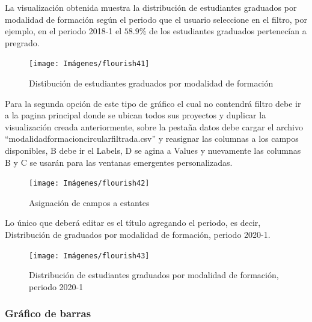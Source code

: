 \documentclass[
]{book}
\begin{document}
La visualización obtenida muestra la distribución de estudiantes graduados por modalidad de formación según el periodo que el usuario seleccione en el filtro, por ejemplo, en el periodo 2018-1 el \(58.9\%\) de los estudiantes graduados pertenecían a pregrado.

\begin{figure}

{\centering \texttt{[image: Imágenes/flourish41]} 

}

\caption{Distibución de estudiantes graduados por modalidad de formación}\label{fig:graficocircularconfiltroflourish-fig}
\end{figure}

Para la segunda opción de este tipo de gráfico el cual no contendrá filtro debe ir a la pagina principal donde se ubican todos sus proyectos y duplicar la visualización creada anteriormente, sobre la pestaña datos debe cargar el archivo ``modalidadformacioncircularfiltrada.csv'' y reasignar las columnas a los campos disponibles, B debe ir el Labels, D se agina a Values y nuevamente las columnas B y C se usarán para las ventanas emergentes personalizadas.

\begin{figure}

{\centering \texttt{[image: Imágenes/flourish42]} 

}

\caption{Asignación de campos a estantes}\label{fig:graficocircularflourish-fig}
\end{figure}

Lo único que deberá editar es el título agregando el periodo, es decir, Distribución de graduados por modalidad de formación, periodo 2020-1.

\begin{figure}

{\centering \texttt{[image: Imágenes/flourish43]} 

}

\caption{Distribución de estudiantes graduados por modalidad de formación, periodo 2020-1}\label{fig:graficocircularflourishsinfiltro-fig}
\end{figure}

\hypertarget{gruxe1fico-de-barras-1}{%
\subsubsection{Gráfico de barras}\label{gruxe1fico-de-barras-1}}
\end{document}
